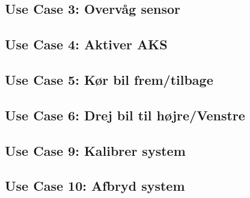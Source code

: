 \newpage
\subsection{Use Case 3: Overvåg sensor}


\newpage
\subsection{Use Case 4: Aktiver AKS}


\newpage
\subsection{Use Case 5: Kør bil frem/tilbage}


\newpage
\subsection{Use Case 6: Drej bil til højre/Venstre}


\newpage
%

\newpage
%

\newpage
\subsection{Use Case 9: Kalibrer system}


\newpage 
\subsection{Use Case 10: Afbryd system}
